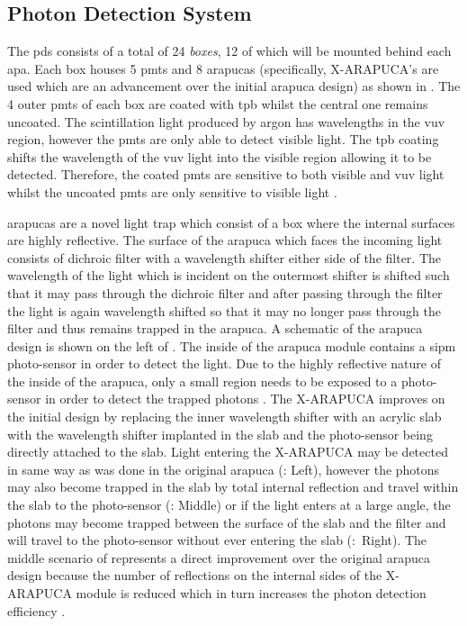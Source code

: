 \subsection*{Photon Detection System}
The \gls{pds} consists of a total of 24 \textit{boxes}, 12 of which will be mounted behind each \gls{apa}. Each box houses 5 \glspl{pmt} and 8 \glspl{arapuca} (specifically, X-ARAPUCA's are used which are an advancement over the initial \gls{arapuca} design) as shown in . The 4 outer \glspl{pmt} of each box are coated with \gls{tpb} whilst the central one remains uncoated. The scintillation light produced by argon has wavelengths in the \gls{vuv} region, however the \glspl{pmt} are only able to detect visible light. The \gls{tpb} coating shifts the wavelength of the \gls{vuv} light into the visible region allowing it to be detected. Therefore, the coated \glspl{pmt} are sensitive to both visible and \gls{vuv} light whilst the uncoated \glspl{pmt} are only sensitive to visible light \cite{LArTPC_review}. 

\glspl{arapuca} are a novel light trap which consist of a box where the internal surfaces are highly reflective. The surface of the \gls{arapuca} which faces the incoming light consists of dichroic filter with a wavelength shifter either side of the filter. The wavelength of the light which is incident on the outermost shifter is shifted such that it may pass through the dichroic filter and after passing through the filter the light is again wavelength shifted so that it may no longer pass through the filter and thus remains trapped in the \gls{arapuca}. A schematic of the \gls{arapuca} design is shown on the left of . The inside of the \gls{arapuca} module contains a \gls{sipm} photo-sensor in order to detect the light. Due to the highly reflective nature of the inside of the \gls{arapuca}, only a small region needs to be exposed to a photo-sensor in order to detect the trapped photons \cite{ARAPUCA}. The X-ARAPUCA improves on the initial design by replacing the inner wavelength shifter with an acrylic slab with the wavelength shifter implanted in the slab and the photo-sensor being directly attached to the slab. Light entering the X-ARAPUCA may be detected in same way as was done in the original \gls{arapuca} (: Left), however the photons may also become trapped in the slab by total internal reflection and travel within the slab to the photo-sensor (: Middle) or if the light enters at a large angle, the photons may become trapped between the surface of the slab and the filter and will travel to the photo-sensor without ever entering the slab (:~Right). The middle scenario of  represents a direct improvement over the original \gls{arapuca} design because the number of reflections on the internal sides of the X-ARAPUCA module is reduced which in turn increases the photon detection efficiency \cite{X-ARAPUCA}. 

